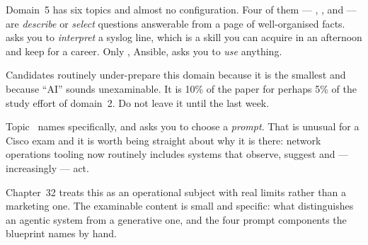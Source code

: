 \begin{examnote}
Domain~5 has six topics and almost no configuration. Four of them --- ,
,  and  --- are \emph{describe} or \emph{select}
questions answerable from a page of well-organised facts.  asks you to
\emph{interpret} a syslog line, which is a skill you can acquire in an afternoon
and keep for a career. Only , Ansible, asks you to \emph{use} anything.

Candidates routinely under-prepare this domain because it is the smallest and
because ``AI'' sounds unexaminable. It is 10\% of the paper for perhaps 5\% of
the study effort of domain~2. Do not leave it until the last week.
\end{examnote}

\begin{conceptbox}
Topic~ names  specifically, and  asks you to
choose a \emph{prompt}. That is unusual for a Cisco exam and it is worth being
straight about why it is there: network operations tooling now routinely includes
systems that observe, suggest and --- increasingly --- act.

Chapter~32 treats this as an operational subject with real limits rather than a
marketing one. The examinable content is small and specific: what distinguishes
an agentic system from a generative one, and the four prompt components the
blueprint names by hand.
\end{conceptbox}
